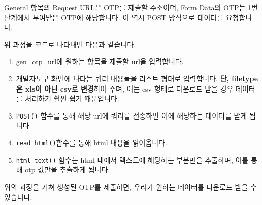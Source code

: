 \documentclass[12pt,]{book}
\newenvironment{Shaded}{\begin{snugshade}}{\end{snugshade}}
\newcommand{\DataTypeTok}[1]{\textcolor[rgb]{0.13,0.29,0.53}{#1}}
\newcommand{\KeywordTok}[1]{\textcolor[rgb]{0.13,0.29,0.53}{\textbf{#1}}}
\newcommand{\NormalTok}[1]{#1}
\newcommand{\OperatorTok}[1]{\textcolor[rgb]{0.81,0.36,0.00}{\textbf{#1}}}
\newcommand{\StringTok}[1]{\textcolor[rgb]{0.31,0.60,0.02}{#1}}
\providecommand{\tightlist}{%
  \setlength{\itemsep}{0pt}\setlength{\parskip}{0pt}}
\begin{document}
General 항목의 Request URL은 OTP를 제출할 주소이며, Form Data의 OTP는 1번 단계에서 부여받은 OTP에 해당합니다. 이 역시 POST 방식으로 데이터를 요청합니다.

위 과정을 코드로 나타내면 다음과 같습니다.

\begin{Shaded}
\end{Shaded}

\begin{enumerate}
\def\labelenumi{\arabic{enumi}.}
\tightlist
\item
  gen\_otp\_url에 원하는 항목을 제출할 url을 입력합니다.
\item
  개발자도구 화면에 나타는 쿼리 내용들을 리스트 형태로 입력합니다. \textbf{단, filetype은 xls이 아닌 csv로 변경}하여 주며, 이는 csv 형태로 다운로드 받을 경우 데이터를 처리하기 훨씬 쉽기 때문입니다.
\item
  \texttt{POST()} 함수를 통해 해당 url에 쿼리를 전송하면 이에 해당하는 데이터를 받게 됩니다.
\item
  \texttt{read\_html()}함수를 통해 html 내용을 읽어옵니다.
\item
  \texttt{html\_text()} 함수는 html 내에서 텍스트에 해당하는 부분만을 추출하며, 이를 통해 otp 값만을 추출하게 됩니다.
\end{enumerate}

위의 과정을 거쳐 생성된 OTP를 제출하면, 우리가 원하는 데이터를 다운로드 받을 수 있습니다.
\end{document}
